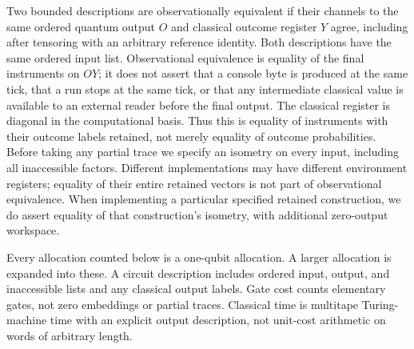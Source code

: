\begin{definition}\label{eqv:def}
Two bounded descriptions are observationally equivalent if their channels
to the same ordered quantum output $O$ and classical outcome register $Y$
agree, including after tensoring with an arbitrary reference identity.
Both descriptions have the same ordered input list. Observational equivalence is equality of the final instruments on $OY$; it does not assert that a console byte is produced at the same tick, that a run stops at the same tick, or that any intermediate classical value is available to an external reader before the final output.
The classical register is diagonal in the computational basis. Thus this
is equality of instruments with their outcome labels retained, not merely
equality of outcome probabilities. Before taking any partial trace we
specify an isometry on every input, including all inaccessible factors.
Different implementations may have different environment registers;
equality of their entire retained vectors is not part of observational
equivalence. When implementing a particular specified retained construction,
we do assert equality of that construction's isometry, with additional
zero-output workspace.

Every allocation counted below is a one-qubit allocation. A larger
allocation is expanded into these. A circuit description includes ordered
input, output, and inaccessible lists and any classical output labels.
Gate cost counts elementary gates, not zero embeddings or partial traces.
Classical time is multitape Turing-machine time with an explicit output
description, not unit-cost arithmetic on words of arbitrary length.
\end{definition}

